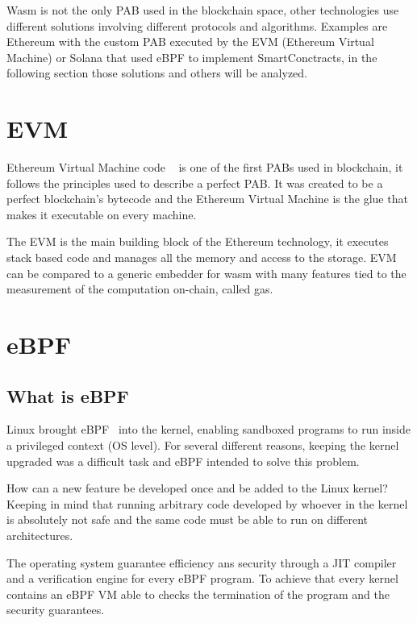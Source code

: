 Wasm is not the only PAB used in the blockchain space, other technologies use different solutions involving different protocols and algorithms. Examples are Ethereum with the custom PAB executed by the EVM (Ethereum Virtual Machine) or Solana that used eBPF to implement SmartConctracts, in the following section those solutions and others will be analyzed.

\section{EVM}

Ethereum Virtual Machine code ~\cite{buterin2014next} is one of the first PABs used in blockchain, it follows the principles used to describe a perfect PAB. It was created to be a perfect blockchain's bytecode and the Ethereum Virtual Machine is the glue that makes it executable on every machine.

The EVM is the main building block of the Ethereum technology, it executes stack based code and manages all the memory and access to the storage. EVM can be compared to a generic embedder for wasm with many features tied to the measurement of the computation on-chain, called gas.

\section{eBPF}

\subsection{What is eBPF}

Linux brought eBPF~\cite{ebpf} into the kernel, enabling sandboxed programs to run inside a privileged context (OS level). For several different reasons, keeping the kernel upgraded was a difficult task and eBPF intended to solve this problem.

How can a new feature be developed once and be added to the Linux kernel? Keeping in mind that running arbitrary code developed by whoever in the kernel is absolutely not safe and the same code must be able to run on different architectures.

The operating system guarantee efficiency ans security through a JIT compiler and a verification engine for every eBPF program. To achieve that every kernel contains an eBPF VM able to checks the termination of the program and the security guarantees.


